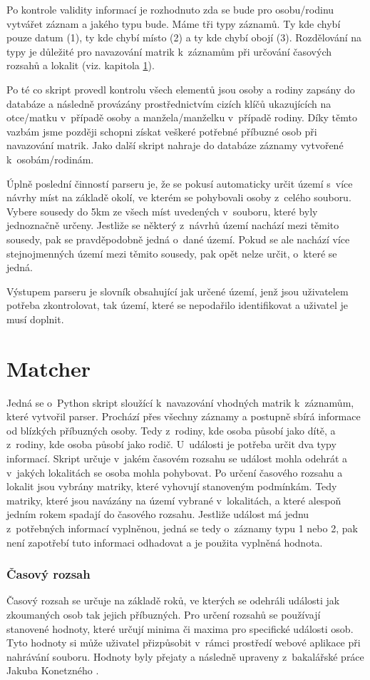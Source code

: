 Po kontrole validity informací je rozhodnuto zda se bude pro osobu/rodinu vytvářet záznam a jakého typu bude. Máme tři typy záznamů. Ty kde chybí pouze datum (1), ty kde chybí místo (2) a ty kde chybí obojí (3). Rozdělování na typy je důležité pro navazování matrik k~záznamům při určování časových rozsahů a lokalit (viz. kapitola \ref{matcher}).

Po té co skript provedl kontrolu všech elementů jsou osoby a rodiny zapsány do databáze a následně provázány prostřednictvím cizích klíčů ukazujících na otce/matku v~případě osoby a manžela/manželku v~případě rodiny. Díky těmto vazbám jsme později schopni získat veškeré potřebné příbuzné osob při navazování matrik. Jako další skript nahraje do databáze záznamy vytvořené k~osobám/rodinám.

Úplně poslední činností parseru je, že se pokusí automaticky určit území s~více návrhy míst na základě okolí, ve kterém se pohybovali osoby z~celého souboru. Vybere sousedy do 5km ze všech míst uvedených v~souboru, které byly jednoznačně určeny. Jestliže se některý z~návrhů území nachází mezi těmito sousedy, pak se pravděpodobně jedná o~dané území. Pokud se ale nachází více stejnojmenných území mezi těmito sousedy, pak opět nelze určit, o~které se jedná.

Výstupem parseru je slovník obsahující jak určené území, jenž jsou uživatelem potřeba zkontrolovat, tak území, které se nepodařilo identifikovat a uživatel je musí doplnit.

\section{Matcher}
\label{matcher}
Jedná se o~Python skript sloužící k~navazování vhodných matrik k~záznamům, které vytvořil parser. Prochází přes všechny záznamy a postupně sbírá informace od blízkých příbuzných osoby. Tedy z~rodiny, kde osoba působí jako dítě, a z~rodiny, kde osoba působí jako rodič. U~události je potřeba určit dva typy informací. Skript určuje v~jakém časovém rozsahu se událost mohla odehrát a v~jakých lokalitách se osoba mohla pohybovat. Po určení časového rozsahu a lokalit jsou vybrány matriky, které vyhovují stanoveným podmínkám. Tedy matriky, které jsou navázány na území vybrané v~lokalitách, a které alespoň jedním rokem spadají do časového rozsahu. Jestliže událost má jednu z~potřebných informací vyplněnou, jedná se tedy o~záznamy typu 1 nebo 2, pak není zapotřebí tuto informaci odhadovat a je použita vyplněná hodnota.

\subsubsection{Časový rozsah}
Časový rozsah se určuje na základě roků, ve kterých se odehráli události jak zkoumaných osob tak jejich příbuzných. Pro určení rozsahů se používají stanovené hodnoty, které určují minima či maxima pro specifické události osob. Tyto hodnoty si může uživatel přizpůsobit v~rámci prostředí webové aplikace při nahrávání souboru. Hodnoty byly přejaty a následně upraveny z~bakalářské práce Jakuba Konetzného \cite{Konetzný}.

